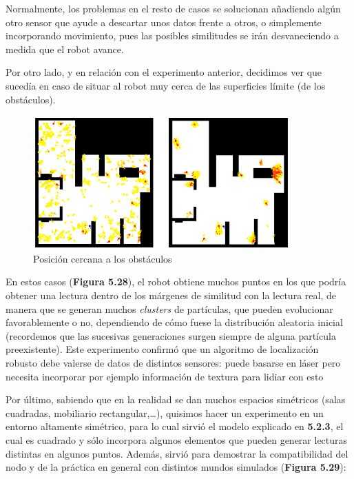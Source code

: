 Normalmente, los problemas en el resto de casos se solucionan añadiendo algún otro sensor que ayude a descartar unos datos frente a otros, o simplemente incorporando movimiento, pues las posibles similitudes se irán desvaneciendo a medida que el robot avance.

Por otro lado, y en relación con el experimento anterior, decidimos ver que sucedía en caso de situar al robot muy cerca de las superficies límite (de los obstáculos).

\begin{figure}[H]
	\begin{center}
		\includegraphics[width=0.88\textwidth]{figures/estampado.png}
		\caption{Posición cercana a los obstáculos}
		\label{fig.estampado}
		\end{center}
\end{figure}

En estos casos (\textbf{Figura 5.28}), el robot obtiene muchos puntos en los que podría obtener una lectura dentro de los márgenes de similitud con la lectura real, de manera que se generan muchos \textit{clusters} de partículas, que pueden evolucionar favorablemente o no, dependiendo de cómo fuese la distribución aleatoria inicial (recordemos que las sucesivas generaciones surgen siempre de alguna partícula preexistente). Este experimento confirmó que un algoritmo de localización robusto debe valerse de datos de distintos sensores: puede basarse en láser pero necesita incorporar por ejemplo información de textura para lidiar con esto

Por último, sabiendo que en la realidad se dan muchos espacios simétricos (salas cuadradas, mobiliario rectangular,…), quisimos hacer un experimento en un entorno altamente simétrico, para lo cual sirvió el modelo explicado en \textbf{5.2.3}, el cual es cuadrado y sólo incorpora algunos elementos que pueden generar lecturas distintas en algunos puntos. Además, sirvió para demostrar la compatibilidad del nodo y de la práctica en general con distintos mundos simulados (\textbf{Figura 5.29}):

